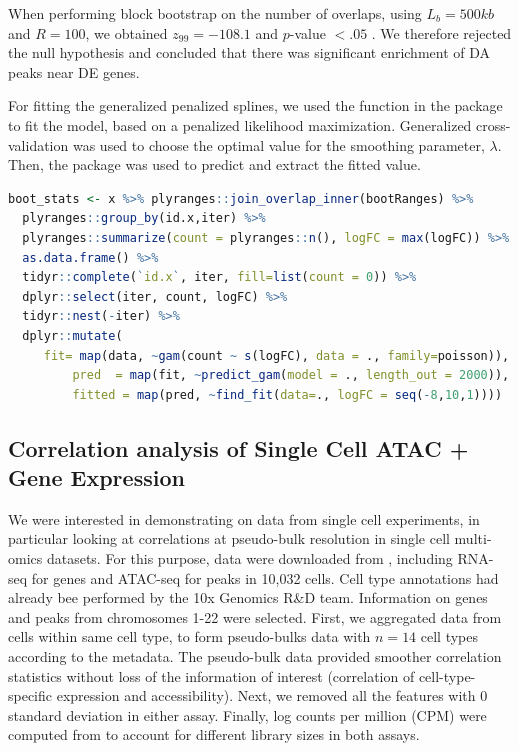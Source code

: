 \documentclass{article}
\begin{document}
When performing block bootstrap on the number of overlaps,
using $L_b = 500kb$ and $R = 100$,
we obtained $z_{99} = -108.1$ and $\textit{p}$-value $<.05$ .
We therefore rejected the null hypothesis and concluded that there was
significant enrichment of DA peaks near DE genes.

For fitting the generalized penalized splines, we used the  function in
the  package  to fit the model, based on
a penalized likelihood maximization. Generalized cross-validation
was used to choose the optimal value for the smoothing parameter,
$\lambda$. Then, the  package was used to predict and
extract the fitted value. 


\begin{lstlisting}[language=R]
boot_stats <- x %>% plyranges::join_overlap_inner(bootRanges) %>%
  plyranges::group_by(id.x,iter) %>%
  plyranges::summarize(count = plyranges::n(), logFC = max(logFC)) %>%
  as.data.frame() %>%
  tidyr::complete(`id.x`, iter, fill=list(count = 0)) %>%
  dplyr::select(iter, count, logFC) %>%
  tidyr::nest(-iter) %>%
  dplyr::mutate(
	 fit= map(data, ~gam(count ~ s(logFC), data = ., family=poisson)),
         pred  = map(fit, ~predict_gam(model = ., length_out = 2000)),
         fitted = map(pred, ~find_fit(data=., logFC = seq(-8,10,1))))

\end{lstlisting} 

\pagebreak

\subsection{Correlation analysis of Single Cell ATAC + Gene Expression}

We were interested in demonstrating \bootranges on data from single
cell experiments, in particular looking at correlations at
pseudo-bulk resolution in single cell multi-omics datasets.
For this purpose, 
data were downloaded from \citet{Vignette}, including
RNA-seq for genes and ATAC-seq for peaks in 10,032 cells.
Cell type annotations had already bee performed
by the 10x Genomics R\&D team. Information on genes and peaks from
chromosomes 1-22 were selected.
First, we aggregated data from cells within same cell type, to form
pseudo-bulks data with $n=14$ cell types according to the metadata. 
The pseudo-bulk data provided smoother correlation statistics without
loss of the information of interest (correlation of cell-type-specific
expression and accessibility).
Next, we removed all the features with 0
standard deviation in either assay.
Finally, log counts per million (CPM) were computed
from   to account for different library sizes
in both assays.
\end{document}
